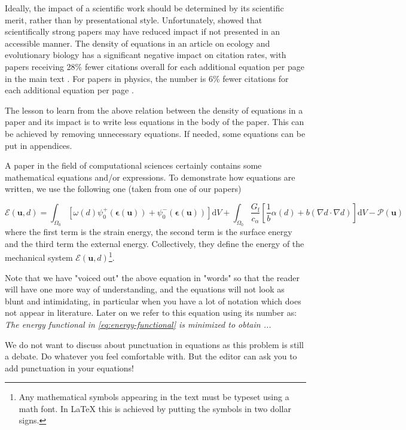 \documentclass[authoryear,12pta4paper,fleqn]{article}
\newcommand{\bfepsilon}{\boldsymbol{\epsilon}}
\newcommand{\bfu}{\boldsymbol{u}}
\newcommand{\td}{\text{d}}
\newcommand{\latex}{\LaTeX\xspace}
\numberwithin{equation}{section}
\theoremstyle{remark}
\begin{document}
Ideally, the impact of a scientific work should be determined by its scientific merit, rather than by presentational style. Unfortunately, \cite{Fawcett11735,Higginson_2016} showed that scientifically strong papers may have reduced impact if not presented in an accessible manner. 
The density of equations in an article on ecology and evolutionary biology has a significant negative impact on citation rates, with papers receiving 28\% fewer citations overall for each additional equation per page in the main text \citep{Fawcett11735}. For papers in physics, the number is 6\% fewer citations for each additional equation per page \citep{Higginson_2016}.

The lesson to learn from the above relation between the density of equations in a paper and its impact is to write less equations in the body of the paper. This can be achieved by removing unnecessary equations. If needed, some equations can be put in appendices.

A paper in the field of computational sciences certainly contains some mathematical equations and/or expressions. To demonstrate how equations are written, we use the following one (taken from one of our papers)

\begin{equation}
  \mathscr{E} (\bfu, d) 
    = \int_{\varOmega_{0}} \left[\omega(d)\psi_{0}^+(\bfepsilon (\bfu)) + \psi_{0}^-(\bfepsilon (\bfu)) \right]\td V
    + \int_{\varOmega_{0}}  \frac{G_\text{f}}{c_\alpha} \left[ \frac{1}{b} \alpha(d)
    + b \left( \nabla d \cdot \nabla d \right) \right] \td V
    - \mathscr{P} (\bfu)   
\label{eq:energy-functional}
\end{equation}
where the first term is the strain energy, the second term is the surface energy and the third term the external energy. Collectively, they define the energy of the mechanical system $\mathscr{E} (\bfu, d)$\footnote{Any mathematical symbols appearing in the text must be typeset using a math font. In \latex this is achieved by putting the symbols in two dollar signs.}.  

Note that we have "voiced out" the above equation in "words" so that the reader will have one more way of understanding, and the equations will not look as blunt and intimidating, in particular when you have a lot of notation which does not appear in literature. Later on we refer to this equation using its number as: \textit{The energy functional in \cref{eq:energy-functional} is minimized to obtain ...}

We do not want to discuss about punctuation in equations as this problem is still a debate. Do whatever you feel comfortable with. But the editor can ask you to add punctuation in your equations!
\end{document}
